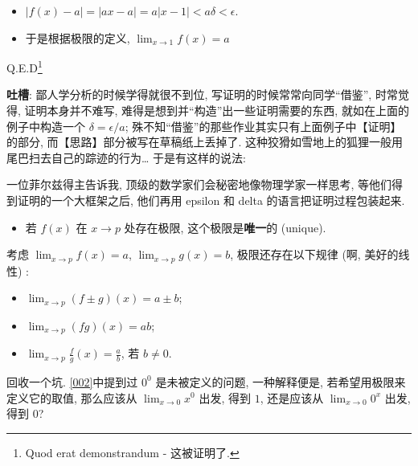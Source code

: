 \begin{tcolorbox}[size=fbox, breakable, enhanced jigsaw, title={极限 (limit)}]
\begin{newquote}
\begin{itemize}

\item
  $|f(x)-a|=|ax-a|=a|x-1|<a\delta<\epsilon$.
\item
  于是根据极限的定义, $\lim_{x\rightarrow 1}f(x)=a$
\end{itemize}

Q.E.D\footnote{Quod erat demonstrandum - 这被证明了.}

\textbf{吐槽}: 鄙人学分析的时候学得就很不到位,
写证明的时候常常向同学``借鉴'', 时常觉得, 证明本身并不难写,
难得是想到并``构造''出一些证明需要的东西, 就如在上面的例子中构造一个
$\delta=\epsilon/a$;
殊不知``借鉴''的那些作业其实只有上面例子中【证明】的部分,
而【思路】部分被写在草稿纸上丢掉了.
这种狡猾如雪地上的狐狸一般用尾巴扫去自己的踪迹的行为\ldots{}
于是有这样的说法:

一位菲尔兹得主告诉我, 顶级的数学家们会秘密地像物理学家一样思考,
等他们得到证明的一个大框架之后, 他们再用 epsilon 和 delta
的语言把证明过程包装起来.
\end{newquote}

\begin{itemize}

\item
  若 $f(x)$ 在 $x\rightarrow p$ 处存在极限,
  这个极限是\textbf{唯一}的 (unique).
\end{itemize}

考虑 $\lim_{x\rightarrow p}f(x)=a$, $\lim_{x\rightarrow p}g(x)=b$,
极限还存在以下规律 (啊, 美好的线性) :

\begin{itemize}

\item
  $\lim_{x\rightarrow p}(f\pm g)(x)=a\pm b$;
\item
  $\lim_{x\rightarrow p}(fg)(x)=ab$;
\item
  $\lim_{x\rightarrow p}\frac{f}{g}(x)=\frac{a}{b}$, 若 $b\neq 0$.
\end{itemize}

\begin{newquote}
回收一个坑. \ref{002}中提到过 $\mathrm{0}^0$ 是未被定义的问题,
一种解释便是, 若希望用极限来定义它的取值, 那么应该从
$\lim_{x\rightarrow0}x^0$ 出发, 得到 $1$, 还是应该从
$\lim_{x\rightarrow0}0^x$ 出发, 得到 $0$?
\end{newquote}

\end{tcolorbox}

